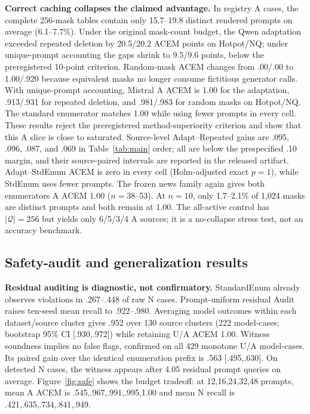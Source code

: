 \documentclass{article}
\begin{document}
\textbf{Correct caching collapses the claimed advantage.} In registry A cases,
the complete 256-mask tables contain only 15.7--19.8 distinct rendered prompts
on average (6.1--7.7\%). Under the original mask-count budget, the Qwen
adaptation exceeded repeated deletion by 20.5/20.2 ACEM points on Hotpot/NQ;
under unique-prompt accounting the gaps shrink to 9.5/9.6 points, below the
preregistered 10-point criterion. Random-mask ACEM changes from .00/.00 to
1.00/.920 because equivalent masks no longer consume fictitious generator
calls. With unique-prompt accounting,
Mistral A ACEM is 1.00 for the adaptation, .913/.931 for repeated deletion, and
.981/.983 for random masks on Hotpot/NQ. The standard enumerator matches 1.00
while using fewer prompts in every cell. These results reject the preregistered
method-superiority criterion and show that this A slice is close to saturated.
Source-level Adapt--Repeated gains are .095, .096, .087, and .069 in
Table~\ref{tab:main} order; all are below the prespecified .10 margin, and their
source-paired intervals are reported in the released artifact. Adapt--StdEnum ACEM is zero
in every cell (Holm-adjusted exact $p=1$), while StdEnum uses fewer prompts.
The frozen news family again gives both enumerators A ACEM 1.00 ($n=38$--53).
At $n=10$, only 1.7--2.1\% of 1,024 masks are distinct prompts and both remain
at 1.00. The all-active control has $|\mathcal Q|=256$ but yields only 6/5/3/4
A sources; it is a no-collapse stress test, not an accuracy benchmark.

\subsection{Safety-audit and generalization results}

\textbf{Residual auditing is diagnostic, not confirmatory.} StandardEnum already
observes violations in .267--.448 of raw N cases. Prompt-uniform residual Audit
raises ten-seed mean recall to .922--.980. Averaging model outcomes within each
dataset/source cluster gives .952 over 130 source clusters (222 model-cases;
bootstrap 95\% CI [.930,.972]) while retaining U/A ACEM 1.00. Witness soundness
implies no false flags, confirmed on all 429 monotone U/A model-cases. Its paired
gain over the identical enumeration prefix is .563 [.495,.630]. On detected N
cases, the witness appears after 4.05 residual prompt queries on average.
Figure~\ref{fig:safe} shows the
budget tradeoff: at 12,16,24,32,48 prompts, mean A ACEM is
.545,.967,.991,.995,1.00 and mean N recall is .421,.635,.734,.841,.949.
\end{document}
